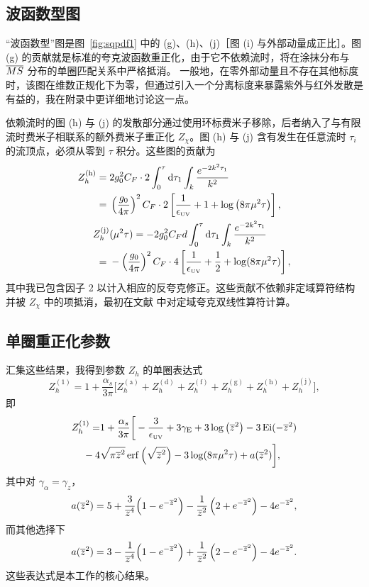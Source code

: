 \subsection{波函数型图}

``波函数型''图是图~\ref{fig:sqpdf1} 中的 (g)、(h)、(j)［图 (i) 与外部动量成正比］。图 (g) 的贡献就是标准的夸克波函数重正化，由于它不依赖流时，将在涂抹分布与 $\overline{MS}$ 分布的单圈匹配关系中严格抵消。
一般地，在零外部动量且不存在其他标度时，该图在维数正规化下为零，但通过引入一个分离标度来暴露紫外与红外发散是有益的，我在附录中更详细地讨论这一点。

依赖流时的图 (h) 与 (j) 的发散部分通过使用环标费米子移除，后者纳入了与有限流时费米子相联系的额外费米子重正化 $Z_\chi$。图 (h) 与 (j) 含有发生在任意流时 $\tau_i$ 的流顶点，必须从零到 $\tau$ 积分。这些图的贡献为
\begin{align}
Z_h^\mathrm{(h)} = {} & 2 g_0^2C_F\cdot 2\int_0^\tau \mathrm{d}\tau_1
\int_k \frac{e^{-2k^2\tau_1}}{k^2} \nonumber \\
= {} & \left(\frac{g_0}{4\pi}\right)^2  C_F \cdot 2\left[\frac{1}{\epsilon_{\scriptscriptstyle\mathrm{UV}}}
+1+\log\big(8\pi\mu^2\tau\big)\right], \label{eq:hth}\\
Z_h^\mathrm{(j)}{} & (\mu^2\tau) = {-} 2g_0^2C_F  d\int_0^\tau \mathrm{d}\tau_1\int_k\frac{e^{-2k^2\tau_1}}{k^2} \nonumber \\
= {} & -\left(\frac{g_0}{4\pi}\right)^2C_F \cdot 4\left[\frac{1}{\epsilon_{\scriptscriptstyle\mathrm{UV}}} +\frac{1}{2} + \log(8\pi\mu^2\tau)\right]\label{eq:htj},
\end{align}
其中我已包含因子 2 以计入相应的反夸克修正。这些贡献不依赖非定域算符结构并被 $Z_\chi$ 中的项抵消，最初在文献 \cite{Endo:2015iea} 中对定域夸克双线性算符计算。

\subsection{单圈重正化参数}

汇集这些结果，我得到参数 $Z_h$ 的单圈表达式
\begin{equation}
Z_h^{(1)} =   1 + \frac{\alpha_s}{3\pi}\Big[Z_h^\mathrm{(a)}+Z_h^\mathrm{(d)} +Z_h^\mathrm{(f)}+Z_h^\mathrm{(g)}+Z_h^\mathrm{(h)}+Z_h^\mathrm{(j)}\Big],
\end{equation}
即
\begin{align}
Z_h^{(1)} = & {} 1 + \frac{\alpha_s}{3\pi}\bigg[-\frac{3}{\epsilon_{\scriptscriptstyle\mathrm{UV}}}+3\gamma_{\mathrm{E}}+3\log\left(\overline{z}^2\right) -3\operatorname{Ei}(-\overline{z}^2)\nonumber\\
{}  -4&\sqrt{\pi\overline{z}^2}\operatorname{erf}\left(\sqrt{\overline{z}^2}\right) -3\log(8\pi\mu^2\tau)+a(\overline{z}^2)\bigg],
\end{align}
其中对 $\gamma_\alpha = \gamma_z$，
\begin{equation}
a(\overline{z}^2) =  5 + \frac{3}{\overline{z}^4} \Big(1-e^{-\overline{z}^2}\Big)- \frac{1}{\overline{z}^2} \left(2+e^{-\overline{z}^2}\right)-4e^{-\overline{z}^2},
\end{equation}
而其他选择下
\begin{equation}
a(\overline{z}^2) =  3 - \frac{1}{\overline{z}^4} \Big(1-e^{-\overline{z}^2}\Big)+ \frac{1}{\overline{z}^2} \left(2-e^{-\overline{z}^2}\right)-4e^{-\overline{z}^2}.
\end{equation}
这些表达式是本工作的核心结果。

